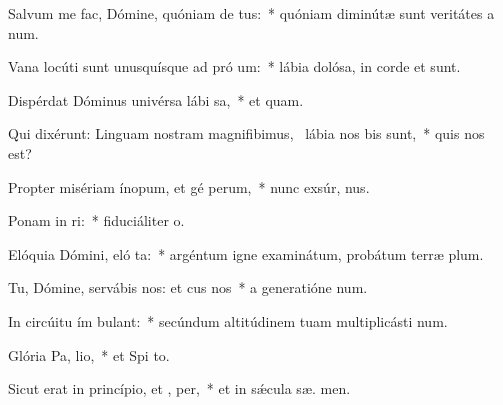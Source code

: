 \item Salvum me fac, Dómine, quóniam de tus:~* quóniam diminútæ sunt veritátes a  num.
\item Vana locúti sunt unusquísque ad pró um:~* lábia dolósa, in corde et   sunt.
\item Dispérdat Dóminus univérsa lábi sa,~* et  quam.
\item Qui dixérunt: Linguam nostram magnifibimus,~\pscross{} lábia nos  bis sunt,~* quis nos  est?
\item Propter misériam ínopum, et gé perum,~* nunc exsúr,  nus.
\item Ponam in ri:~* fiduciáliter   o.
\item Elóquia Dómini, eló ta:~* argéntum igne examinátum, probátum terræ  plum.
\item Tu, Dómine, servábis nos: et cus nos~* a generatióne   num.
\item In circúitu ím bulant:~* secúndum altitúdinem tuam multiplicásti  num.
\item Glória Pa,  lio,~* et Spi to.
\item Sicut erat in princípio, et ,  per,~* et in sǽcula sæ. men.
